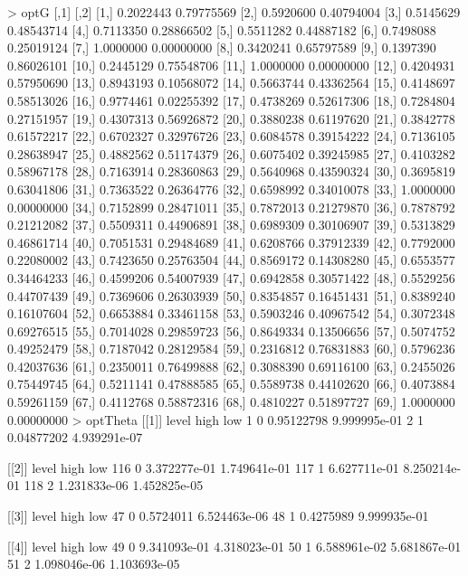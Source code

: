 \documentclass[letterpaper,10pt]{amsart}
\newenvironment{verbatimcode}{\bigskip \scriptsize \verbatim}{\endverbatim \normalsize \bigskip}
\begin{document}
\begin{enumerate}[(1)]
\begin{verbatimcode}
> optG
           [,1]       [,2]
 [1,] 0.2022443 0.79775569
 [2,] 0.5920600 0.40794004
 [3,] 0.5145629 0.48543714
 [4,] 0.7113350 0.28866502
 [5,] 0.5511282 0.44887182
 [6,] 0.7498088 0.25019124
 [7,] 1.0000000 0.00000000
 [8,] 0.3420241 0.65797589
 [9,] 0.1397390 0.86026101
[10,] 0.2445129 0.75548706
[11,] 1.0000000 0.00000000
[12,] 0.4204931 0.57950690
[13,] 0.8943193 0.10568072
[14,] 0.5663744 0.43362564
[15,] 0.4148697 0.58513026
[16,] 0.9774461 0.02255392
[17,] 0.4738269 0.52617306
[18,] 0.7284804 0.27151957
[19,] 0.4307313 0.56926872
[20,] 0.3880238 0.61197620
[21,] 0.3842778 0.61572217
[22,] 0.6702327 0.32976726
[23,] 0.6084578 0.39154222
[24,] 0.7136105 0.28638947
[25,] 0.4882562 0.51174379
[26,] 0.6075402 0.39245985
[27,] 0.4103282 0.58967178
[28,] 0.7163914 0.28360863
[29,] 0.5640968 0.43590324
[30,] 0.3695819 0.63041806
[31,] 0.7363522 0.26364776
[32,] 0.6598992 0.34010078
[33,] 1.0000000 0.00000000
[34,] 0.7152899 0.28471011
[35,] 0.7872013 0.21279870
[36,] 0.7878792 0.21212082
[37,] 0.5509311 0.44906891
[38,] 0.6989309 0.30106907
[39,] 0.5313829 0.46861714
[40,] 0.7051531 0.29484689
[41,] 0.6208766 0.37912339
[42,] 0.7792000 0.22080002
[43,] 0.7423650 0.25763504
[44,] 0.8569172 0.14308280
[45,] 0.6553577 0.34464233
[46,] 0.4599206 0.54007939
[47,] 0.6942858 0.30571422
[48,] 0.5529256 0.44707439
[49,] 0.7369606 0.26303939
[50,] 0.8354857 0.16451431
[51,] 0.8389240 0.16107604
[52,] 0.6653884 0.33461158
[53,] 0.5903246 0.40967542
[54,] 0.3072348 0.69276515
[55,] 0.7014028 0.29859723
[56,] 0.8649334 0.13506656
[57,] 0.5074752 0.49252479
[58,] 0.7187042 0.28129584
[59,] 0.2316812 0.76831883
[60,] 0.5796236 0.42037636
[61,] 0.2350011 0.76499888
[62,] 0.3088390 0.69116100
[63,] 0.2455026 0.75449745
[64,] 0.5211141 0.47888585
[65,] 0.5589738 0.44102620
[66,] 0.4073884 0.59261159
[67,] 0.4112768 0.58872316
[68,] 0.4810227 0.51897727
[69,] 1.0000000 0.00000000
> optTheta
[[1]]
  level       high          low
1     0 0.95122798 9.999995e-01
2     1 0.04877202 4.939291e-07

[[2]]
    level         high          low
116     0 3.372277e-01 1.749641e-01
117     1 6.627711e-01 8.250214e-01
118     2 1.231833e-06 1.452825e-05

[[3]]
   level      high          low
47     0 0.5724011 6.524463e-06
48     1 0.4275989 9.999935e-01

[[4]]
   level         high          low
49     0 9.341093e-01 4.318023e-01
50     1 6.588961e-02 5.681867e-01
51     2 1.098046e-06 1.103693e-05


\end{verbatimcode}
\end{enumerate}
\end{document}
